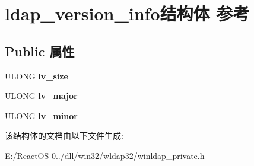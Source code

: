 \hypertarget{structldap__version__info}{}\section{ldap\+\_\+version\+\_\+info结构体 参考}
\label{structldap__version__info}
\subsection*{Public 属性}
\begin{DoxyCompactItemize}
\item 
\mbox{\label{structldap__version__info_a4841f1b3a585876750d85f389a5f6e87}} 
U\+L\+O\+NG {\bfseries lv\+\_\+size}
\item 
\mbox{\label{structldap__version__info_a5feff38dbed55eda8fb55dc0d630c827}} 
U\+L\+O\+NG {\bfseries lv\+\_\+major}
\item 
\mbox{\label{structldap__version__info_ab8a141c90208f3a7a6c5a78a29dc58ab}} 
U\+L\+O\+NG {\bfseries lv\+\_\+minor}
\end{DoxyCompactItemize}


该结构体的文档由以下文件生成\+:\begin{DoxyCompactItemize}
\item 
E\+:/\+React\+O\+S-\/0../dll/win32/wldap32/winldap\+\_\+private.\+h\end{DoxyCompactItemize}
